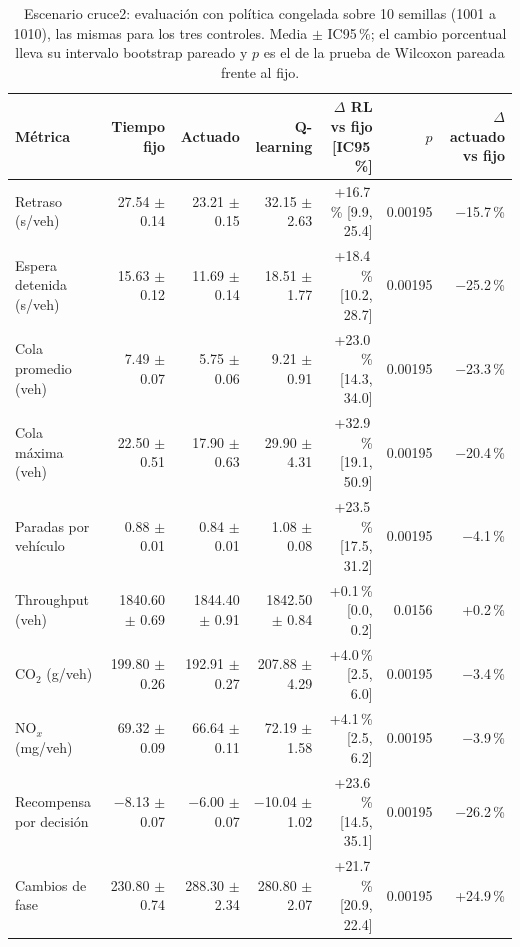 \begin{table}[H]
\centering
\scriptsize
\setlength{\tabcolsep}{3pt}
\begin{tabular}{lrrrrrr}
\toprule
Métrica & Tiempo fijo & Actuado & Q-learning & \makecell{$\Delta$ RL vs fijo\\{}[IC95\,\%]} & $p$ & \makecell{$\Delta$ actuado\\vs fijo} \\
\midrule
Retraso (s/veh) & 27.54 $\pm$ 0.14 & 23.21 $\pm$ 0.15 & 32.15 $\pm$ 2.63 & +16.7\,\% [9.9, 25.4] & 0.00195 & $-$15.7\,\% \\
Espera detenida (s/veh) & 15.63 $\pm$ 0.12 & 11.69 $\pm$ 0.14 & 18.51 $\pm$ 1.77 & +18.4\,\% [10.2, 28.7] & 0.00195 & $-$25.2\,\% \\
Cola promedio (veh) & 7.49 $\pm$ 0.07 & 5.75 $\pm$ 0.06 & 9.21 $\pm$ 0.91 & +23.0\,\% [14.3, 34.0] & 0.00195 & $-$23.3\,\% \\
Cola máxima (veh) & 22.50 $\pm$ 0.51 & 17.90 $\pm$ 0.63 & 29.90 $\pm$ 4.31 & +32.9\,\% [19.1, 50.9] & 0.00195 & $-$20.4\,\% \\
Paradas por vehículo & 0.88 $\pm$ 0.01 & 0.84 $\pm$ 0.01 & 1.08 $\pm$ 0.08 & +23.5\,\% [17.5, 31.2] & 0.00195 & $-$4.1\,\% \\
Throughput (veh) & 1840.60 $\pm$ 0.69 & 1844.40 $\pm$ 0.91 & 1842.50 $\pm$ 0.84 & +0.1\,\% [0.0, 0.2] & 0.0156 & +0.2\,\% \\
CO$_2$ (g/veh) & 199.80 $\pm$ 0.26 & 192.91 $\pm$ 0.27 & 207.88 $\pm$ 4.29 & +4.0\,\% [2.5, 6.0] & 0.00195 & $-$3.4\,\% \\
NO$_x$ (mg/veh) & 69.32 $\pm$ 0.09 & 66.64 $\pm$ 0.11 & 72.19 $\pm$ 1.58 & +4.1\,\% [2.5, 6.2] & 0.00195 & $-$3.9\,\% \\
Recompensa por decisión & $-$8.13 $\pm$ 0.07 & $-$6.00 $\pm$ 0.07 & $-$10.04 $\pm$ 1.02 & +23.6\,\% [14.5, 35.1] & 0.00195 & $-$26.2\,\% \\
Cambios de fase & 230.80 $\pm$ 0.74 & 288.30 $\pm$ 2.34 & 280.80 $\pm$ 2.07 & +21.7\,\% [20.9, 22.4] & 0.00195 & +24.9\,\% \\
\bottomrule
\end{tabular}
\caption[Escenario cruce2: evaluación con política congelada]{Escenario cruce2: evaluación con política congelada sobre 10 semillas (1001 a 1010), las mismas para los tres controles. Media $\pm$ IC95\,\%; el cambio porcentual lleva su intervalo bootstrap pareado y $p$ es el de la prueba de Wilcoxon pareada frente al fijo.}
\label{tab:cruce2-evaluacion}
\end{table}
